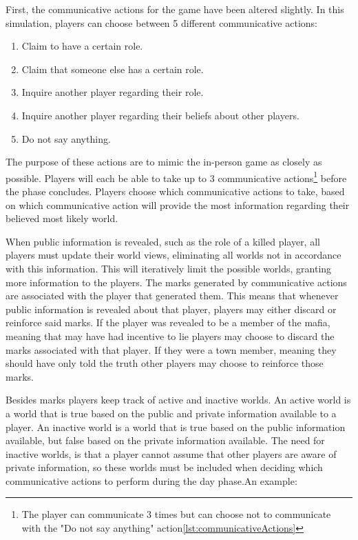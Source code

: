 First, the communicative actions for the game have been altered slightly. In
this simulation, players can choose between 5 different communicative actions:
\begin{enumerate}
	\itemsep0px
	\item \label{Com}Claim to have a certain role.
	\item Claim that someone else has a certain role.
	\item Inquire another player regarding their role.
	\item Inquire another player regarding their beliefs about other players.
	\item Do not say anything. \label{lst:communicativeActions}
\end{enumerate}
The purpose of these actions are to mimic the in-person game as closely as
possible. Players will each be able to take up to 3 communicative actions\footnote{The player can communicate 3 times but can choose not to communicate with the "Do not say anything" action\ref{lst:communicativeActions}} before the
phase concludes. Players choose which communicative actions to take, based on which communicative action
will provide the most information regarding their believed most likely world.

When public information is revealed, such as the role of a killed player, all
players must update their world views, eliminating all worlds not in accordance
with this information. This will iteratively limit the possible worlds,
granting more information to the players. The marks generated by communicative
actions are associated with the player that generated them. This means that
whenever public information is revealed about that player, players may either
discard or reinforce said marks. If the player was revealed to be a member of
the mafia, meaning that may have had incentive to lie players may choose to
discard the marks associated with that player. If they were a town member,
meaning they should have only told the truth other players may choose to
reinforce those marks.

Besides marks players keep track of active and inactive worlds. An active world
is a world that is true based on the public and private information available
to a player. An inactive world is a world that is true based on the public
information available, but false based on the private information available.
The need for inactive worlds, is that a player cannot assume that other players
are aware of private information, so these worlds must be included when
deciding which communicative actions to perform during the day phase.An
example:

